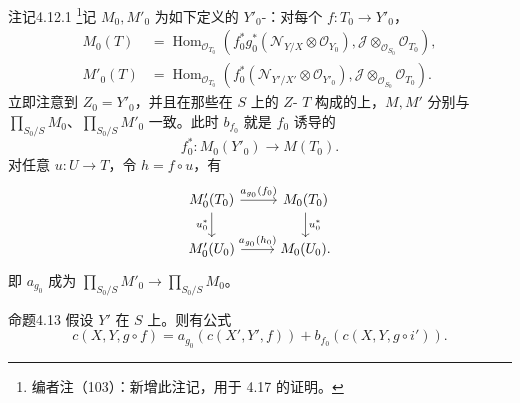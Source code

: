 \begin{SGAresult}{注记}{4.12.1}
\footnote{编者注（103）：新增此注记，用于 4.17 的证明。}记 $M_0,M'_0$ 为如下定义的 $Y'_0$-：对每个 $f:T_0\to Y'_0$，
\[
\begin{aligned}
M_0(T)&=\operatorname{Hom}_{\mathscr O_{T_0}}(f_0^*g_0^*(\mathscr N_{Y/X}\otimes\mathscr O_{Y_0}),\mathscr J\otimes_{\mathscr O_{S_0}}\mathscr O_{T_0}),\\
M'_0(T)&=\operatorname{Hom}_{\mathscr O_{T_0}}(f_0^*(\mathscr N_{Y'/X'}\otimes\mathscr O_{Y'_0}),\mathscr J\otimes_{\mathscr O_{S_0}}\mathscr O_{T_0}).
\end{aligned}
\]
立即注意到 $Z_0=Y'_0$，并且在那些在 $S$ 上的 $Z$- $T$ 构成的上，$M,M'$ 分别与 $\prod_{S_0/S}M_0$、$\prod_{S_0/S}M'_0$ 一致。此时 $b_{f_0}$ 就是 $f_0$ 诱导的
\[f_0^*:M_0(Y'_0)\longrightarrow M(T_0).\]
对任意 $u:U\to T$，令 $h=f\circ u$，有
\[
\begin{tikzcd}
M'_0(T_0)\arrow[r,"a_{g_0}(f_0)"]\arrow[d,"u_0^*"']&M_0(T_0)\arrow[d,"u_0^*"]\\
M'_0(U_0)\arrow[r,"a_{g_0}(h_0)"]&M_0(U_0).
\end{tikzcd}
\]
即 $a_{g_0}$ 成为 $\prod_{S_0/S}M'_0\to\prod_{S_0/S}M_0$。
\end{SGAresult}
\begin{SGAresult}{命题}{4.13}
假设 $Y'$ 在 $S$ 上。则有公式
\[c(X,Y,g\circ f)=a_{g_0}(c(X',Y',f))+b_{f_0}(c(X,Y,g\circ i')).\]
\end{SGAresult}
